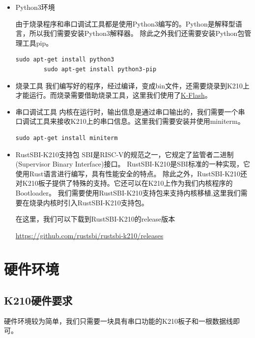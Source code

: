 \begin{itemize}
    \item Python3环境
    
    由于烧录程序和串口调试工具都是使用Python3编写的。Python是解释型语言，所以我们需要安装Python3解释器。\cite{2009Python}
    除此之外我们还需要安装Python包管理工具pip。\cite{2013Installing}

    \begin{lstlisting}[caption={安装Python3环境}, label={lst:install_python3}]
        sudo apt-get install python3
        sudo apt-get install python3-pip
    \end{lstlisting}

    \item 烧录工具
    我们编写好的程序，经过编译，变成bin文件，还需要烧录到K210上才能运行。而烧录需要借助烧录工具，这里我们使用了\href{https://github.com/BITzga/riscv64-pke-k210/blob/master/compile_tool/kflash.py}{K-Flash}。
    \item 串口调试工具
    内核在运行时，输出信息是通过串口输出的，我们需要一个串口调试工具来接收K210上的串口信息。这里我们需要安装并使用miniterm。

    \begin{lstlisting}[caption={安装miniterm}, label={lst:install_miniterm}]
        sudo apt-get install miniterm
    \end{lstlisting}

    \item RustSBI-K210支持包
    SBI是RISC-V的规范之一，它规定了监管者二进制(Supervisor Binary Interface)接口。
    RustSBI-K210是SBI标准的一种实现，它使用Rust语言进行编写，具有性能安全的特点。
    除此之外，RustSBI-K210还对K210板子提供了特殊的支持。它还可以在K210上作为我们内核程序的Bootloader。\cite{马学文2005嵌入式系统中}
    我们需要使用RustSBI-K210支持包来支持内核移植,这里我们需要在烧录内核时引入RustSBI-K210支持包。

    在这里，我们可以下载到RustSBI-K210的release版本

    \href{https://github.com/rustsbi/rustsbi-k210/releases}{https://github.com/rustsbi/rustsbi-k210/releases}
    
\end{itemize}

\section{硬件环境}

\subsection{K210硬件要求}

硬件环境较为简单，我们只需要一块具有串口功能的K210板子和一根数据线即可。

